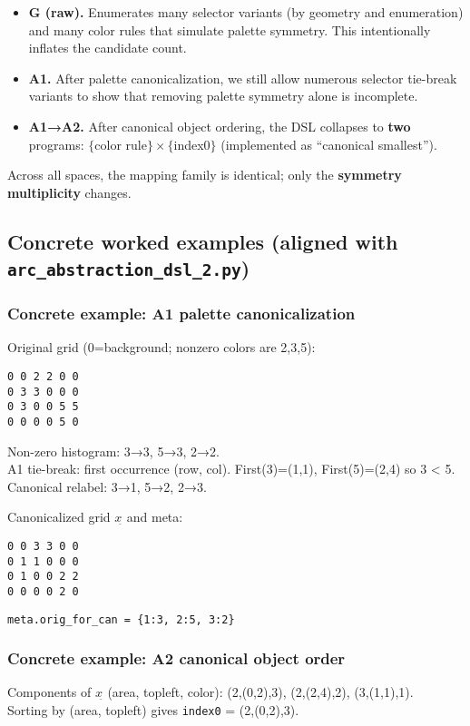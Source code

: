 \documentclass[11pt]{article}
\newcommand{\code}[1]{\texttt{#1}}
\begin{document}
\begin{itemize}
\item \textbf{G (raw).} Enumerates many selector variants (by geometry and enumeration) and many color rules that simulate palette symmetry. This intentionally inflates the candidate count.
\item \textbf{A1.} After palette canonicalization, we still allow numerous selector tie-break variants to show that removing palette symmetry alone is incomplete.
\item \textbf{A1→A2.} After canonical object ordering, the DSL collapses to \textbf{two} programs: $\{$color rule$\} \times \{$index0$\}$ (implemented as ``canonical smallest'').
\end{itemize}

Across all spaces, the mapping family is identical; only the \textbf{symmetry multiplicity} changes.


\subsection{Concrete worked examples (aligned with \code{arc\_abstraction\_dsl\_2.py})}

\subsubsection{Concrete example: A1 palette canonicalization}

Original grid (0=background; nonzero colors are 2,3,5):
\begin{lstlisting}
0 0 2 2 0 0
0 3 3 0 0 0
0 3 0 0 5 5
0 0 0 0 5 0
\end{lstlisting}

Non-zero histogram: 3→3, 5→3, 2→2.\\
A1 tie-break: first occurrence (row, col). First(3)=(1,1), First(5)=(2,4) so 3 < 5.\\
Canonical relabel: 3→1, 5→2, 2→3.

Canonicalized grid $x_{\hat{}}$ and meta:
\begin{lstlisting}
0 0 3 3 0 0
0 1 1 0 0 0
0 1 0 0 2 2
0 0 0 0 2 0
\end{lstlisting}
\code{meta.orig\_for\_can = \{1:3, 2:5, 3:2\}}

\subsubsection{Concrete example: A2 canonical object order}
Components of $x_{\hat{}}$ (area, topleft, color):
(2,(0,2),3), (2,(2,4),2), (3,(1,1),1).\\
Sorting by (area, topleft) gives \code{index0} = (2,(0,2),3).
\end{document}
